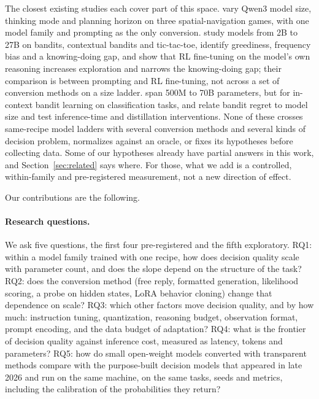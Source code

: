 The closest existing studies each cover part of this space. \citet{jiwatode2026spatial} vary Qwen3 model size, thinking mode and planning horizon on three spatial-navigation games, with one model family and prompting as the only conversion. \citet{schmied2026greedy} study models from 2B to 27B on bandits, contextual bandits and tic-tac-toe, identify greediness, frequency bias and a knowing-doing gap, and show that RL fine-tuning on the model's own reasoning increases exploration and narrows the knowing-doing gap; their comparison is between prompting and RL fine-tuning, not across a set of conversion methods on a size ladder. \citet{monea2025icrl} span 500M to 70B parameters, but for in-context bandit learning on classification tasks, and \citet{nie2025evolve} relate bandit regret to model size and test inference-time and distillation interventions. None of these crosses same-recipe model ladders with several conversion methods and several kinds of decision problem, normalizes against an oracle, or fixes its hypotheses before collecting data. Some of our hypotheses already have partial answers in this work, and Section~\ref{sec:related} says where. For those, what we add is a controlled, within-family and pre-registered measurement, not a new direction of effect.

Our contributions are the following.
\paragraph{Research questions.}
We ask five questions, the first four pre-registered and the fifth exploratory. RQ1: within a model family trained with one recipe, how does decision quality scale with parameter count, and does the slope depend on the structure of the task? RQ2: does the conversion method (free reply, formatted generation, likelihood scoring, a probe on hidden states, LoRA behavior cloning) change that dependence on scale? RQ3: which other factors move decision quality, and by how much: instruction tuning, quantization, reasoning budget, observation format, prompt encoding, and the data budget of adaptation? RQ4: what is the frontier of decision quality against inference cost, measured as latency, tokens and parameters? RQ5: how do small open-weight models converted with transparent methods compare with the purpose-built decision models that appeared in late 2026 and run on the same machine, on the same tasks, seeds and metrics, including the calibration of the probabilities they return?

